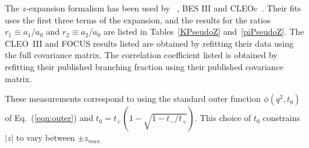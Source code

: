 \begin{table}[htbp]
\begin{center}
\begin{tabular}{cccc}
\vspace*{-10pt} & \\
\hline
\end{tabular}
\end{center}
\end{table}

The $z$-expansion formalism has been used by \babar~\cite{Aubert:2007wg,babar-new}, 
BES III\cite{BESIII-new} and CLEOc~\cite{Besson:2009uv,Dobbs:2007aa}.
Their fits uses the first three terms of the expansion, %
and the results for the ratios $r_1\equiv a_1/a_0$ and $r_2\equiv a_2/a_0$ are 
listed in Tables~\ref{KPseudoZ} and~\ref{piPseudoZ}. 
The CLEO~III\cite{Huang:2004fra} and FOCUS\cite{Link:2004dh} results 
listed are obtained by refitting their data using the full
covariance matrix. The \babar correlation coefficient listed is 
obtained by refitting their published branching fraction using 
their published covariance matrix.  

These measurements correspond to using the standard 
outer function $\phi(q^2,t_0)$ of Eq.~(\ref{eqn:outer}) and 
$t_0=t_+\left(1-\sqrt{1-t_-/t_+}\right)$. This choice of $t^{}_0$
constrains $|z|$ to vary between $\pm z_{max.}$

